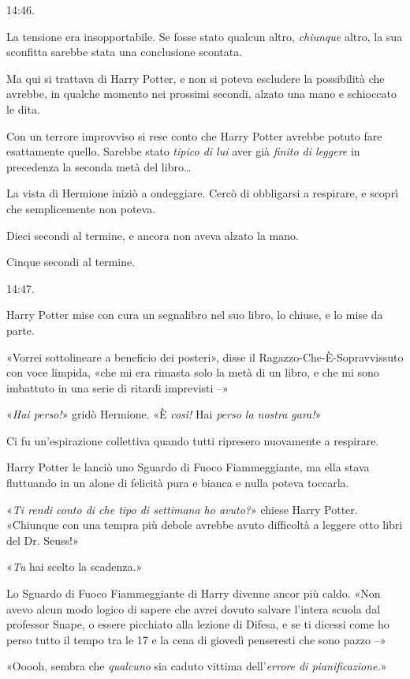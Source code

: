 14:46.

La tensione era insopportabile. Se fosse stato qualcun altro, \textit{chiunque} altro, la sua sconfitta sarebbe stata una conclusione scontata.

Ma qui si trattava di Harry Potter, e non si poteva escludere la possibilità che avrebbe, in qualche momento nei prossimi secondi, alzato una mano e schioccato le dita.

Con un terrore improvviso si rese conto che Harry Potter avrebbe potuto fare esattamente quello. Sarebbe stato \textit{tipico di lui} aver già \textit{finito di leggere} in precedenza la seconda metà del libro…

La vista di Hermione iniziò a ondeggiare. Cercò di obbligarsi a respirare, e scoprì che semplicemente non poteva.

Dieci secondi al termine, e ancora non aveva alzato la mano.

Cinque secondi al termine.

14:47.

Harry Potter mise con cura un segnalibro nel suo libro, lo chiuse, e lo mise da parte.

«Vorrei sottolineare a beneficio dei posteri», disse il Ragazzo-Che-È-Sopravvissuto con voce limpida, «che mi era rimasta solo la metà di un libro, e che mi sono imbattuto in una serie di ritardi imprevisti –»

«\textit{Hai perso!}» gridò Hermione. «È \textit{così!} Hai \textit{perso la nostra gara!}»

Ci fu un’espirazione collettiva quando tutti ripresero nuovamente a respirare.

Harry Potter le lanciò uno Sguardo di Fuoco Fiammeggiante, ma ella stava fluttuando in un alone di felicità pura e bianca e nulla poteva toccarla.

«\textit{Ti rendi conto di che tipo di settimana ho avuto?}» chiese Harry Potter. «Chiunque con una tempra più debole avrebbe avuto difficoltà a leggere otto libri del Dr. Seuss!»

«\textit{Tu} hai scelto la scadenza.»

Lo Sguardo di Fuoco Fiammeggiante di Harry divenne ancor più caldo. «Non avevo alcun modo logico di sapere che avrei dovuto salvare l’intera scuola dal professor Snape, o essere picchiato alla lezione di Difesa, e se ti dicessi come ho perso tutto il tempo tra le 17 e la cena di giovedì penseresti che sono pazzo –»

«Ooooh, sembra che \textit{qualcuno} sia caduto vittima dell’\textit{errore di pianificazione.}»

